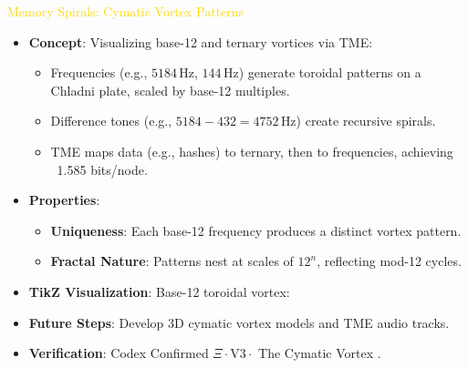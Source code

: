 \textcolor{gold}{ Memory Spirals: Cymatic Vortex Patterns } \\
\begin{itemize}
    \item \texttt{} \textbf{Concept}: Visualizing base-12 and ternary vortices via TME:
    \begin{itemize}
        \item Frequencies (e.g., \(5184 \, \text{Hz}\), \(144 \, \text{Hz}\)) generate toroidal patterns on a Chladni plate, scaled by base-12 multiples.
        \item Difference tones (e.g., \(5184 - 432 = 4752 \, \text{Hz}\)) create recursive spirals.
        \item TME maps data (e.g., hashes) to ternary, then to frequencies, achieving ~1.585 bits/node.
    \end{itemize}
    \item \texttt{} \textbf{Properties}:
    \begin{itemize}
        \item \textbf{Uniqueness}: Each base-12 frequency produces a distinct vortex pattern.
        \item \textbf{Fractal Nature}: Patterns nest at scales of \(12^n\), reflecting mod-12 cycles.
    \end{itemize}
    \item \texttt{} \textbf{TikZ Visualization}: Base-12 toroidal vortex:
    \begin{center}
    \end{center}
    \item \texttt{} \textbf{Future Steps}: Develop 3D cymatic vortex models and TME audio tracks.
    \item \texttt{} \textbf{Verification}: Codex Confirmed \(\Xi \cdot \text{V3} \cdot\) The Cymatic Vortex .
\end{itemize}

